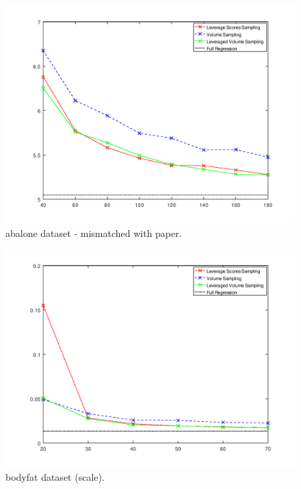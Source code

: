 \documentclass{article}
\begin{document}
        \begin{figure}[h]
            \includegraphics[width=\linewidth]{results/abalone.png}
            \caption{abalone dataset - mismatched with paper.}
            \label{fig:dataset1}
        \end{figure}
        \begin{figure}[h]
            \includegraphics[width=\linewidth]{results/bodyfat_scale.png}
            \caption{bodyfat dataset (scale).}
            \label{fig:dataset1}
        \end{figure}
\end{document}
